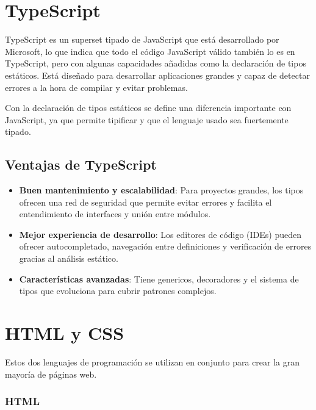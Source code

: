 
\section{TypeScript}\label{typescript}
TypeScript es un superset tipado de JavaScript que está desarrollado por Microsoft, lo que indica que todo el código JavaScript válido también lo es en TypeScript, pero con algunas capacidades añadidas como la declaración de tipos estáticos. Está diseñado para desarrollar aplicaciones grandes y capaz de detectar errores a la hora de compilar y evitar problemas.

Con la declaración de tipos estáticos se define una diferencia importante con JavaScript, ya que permite tipificar y que el lenguaje usado sea fuertemente tipado.

\subsection{Ventajas de TypeScript}

\begin{itemize}
  \item \textbf{Buen mantenimiento y escalabilidad}:
        Para proyectos grandes, los tipos ofrecen una red de seguridad que permite evitar errores y facilita el entendimiento de interfaces y unión entre módulos.
  \item \textbf{Mejor experiencia de desarrollo}: 
        Los editores de código (IDEs) pueden ofrecer autocompletado, navegación entre definiciones y verificación de errores gracias al análisis estático.
  \item \textbf{Características avanzadas}:
        Tiene genericos, decoradores y el sistema de tipos que evoluciona para cubrir patrones complejos.
\end{itemize}


\section{HTML y CSS}\label{html-css}
Estos dos lenguajes de programación se utilizan en conjunto para crear la gran mayoría de páginas web.

\subsubsection{HTML}

